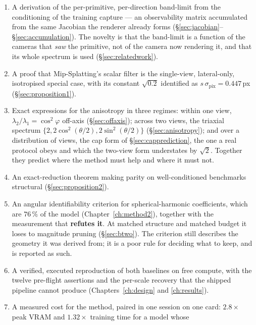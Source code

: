 \begin{enumerate}[leftmargin=1.4em,itemsep=2pt]
  \item A derivation of the per-primitive, per-direction band-limit from the
        conditioning of the training capture --- an observability matrix
        accumulated from the same Jacobian the renderer already forms
        (\S\ref{sec:jacobian}--\S\ref{sec:accumulation}). The novelty is that
        the band-limit is a function of the cameras that \emph{saw} the
        primitive, not of the camera now rendering it, and that its whole spectrum is used
        (\S\ref{sec:relatedwork}).
  \item A proof that Mip-Splatting's scalar filter is the single-view,
        lateral-only, isotropised special case, with its constant $\sqrt{0.2}$
        identified as $s\,\sigma_{\mathrm{pix}} = 0.447$\,px
        (\S\ref{sec:proposition1}).
  \item Exact expressions for the anisotropy in three regimes: within one view,
        $\lambda_2/\lambda_1 = \cos^2\varphi$ off-axis (\S\ref{sec:offaxis});
        across two views, the triaxial spectrum
        $\{2, 2\cos^2(\theta/2), 2\sin^2(\theta/2)\}$
        (\S\ref{sec:anisotropy}); and over a distribution of views, the cap form of \S\ref{sec:capprediction}, the one a real protocol obeys and
        which the two-view form understates by $\sqrt{2}$. Together they predict
        where the method must help and where it must not.
  \item An exact-reduction theorem making parity on well-conditioned benchmarks
        structural (\S\ref{sec:proposition2}).
  \item An angular identifiability criterion for spherical-harmonic coefficients, which are $76\,\%$ of the model
  (Chapter~\ref{ch:method2}), together with the measurement that \textbf{refutes
  it}. At matched
        structure and matched budget it loses to magnitude pruning
        (\S\ref{sec:btwo}). The criterion still describes the geometry it was
        derived from; it is a poor rule for deciding what to keep, and is
        reported as such.
  \item A verified, executed reproduction of both baselines on free compute,
        with the twelve pre-flight assertions and the per-scale recovery that
        the shipped pipeline cannot produce (Chapters~\ref{ch:design} and
        \ref{ch:results}).
  \item A measured cost for the method, paired in one session on one card:
        $2.8\times$ peak VRAM and $1.32\times$ training time for a model whose

\end{enumerate}
